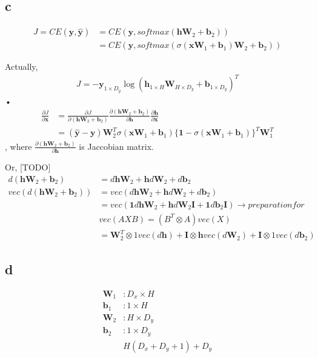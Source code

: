 \documentclass[11pt, oneside]{article}   	%
\begin{document}
\subsection{c}
\begin{align}
J = CE(\bm{y}, \hat{\bm{y}}) &= CE(\bm{y}, softmax(\bm{h}\bm{W}_2+\bm{b}_2))\\
&= CE(\bm{y}, softmax(\sigma(\bm{x}\bm{W}_1+\bm{b}_1)\bm{W}_2+\bm{b}_2))
\end{align}

Actually, 
\begin{align}
J = - \bm{y}_{1\times D_y} {\log (\bm{h}_{1\times H}\bm{W}_{H \times D_y}+\bm{b}_{1\times D_y})}^T
\end{align}•
\begin{align}
\frac{\partial J}{\partial \bm{x}} &=\frac{\partial J}{\partial (\bm{h}\bm{W}_2+\bm{b}_2)}\frac{\partial (\bm{h}\bm{W}_2+\bm{b}_2)}{\partial \bm{h}}\frac{\partial \bm{h}}{\partial \bm{x}}\\
&= (\hat{\bm{y}} - \bm{y})\bm{W}_2^T\sigma(\bm{x}\bm{W}_1+\bm{b}_1)\{\bm{1} - \sigma(\bm{x}\bm{W}_1+\bm{b}_1)\}^T\bm{W}_1^T
\end{align},
where $\frac{\partial (\bm{h}\bm{W}_2+\bm{b}_2)}{\partial \bm{h}}$ is Jaccobian matrix.

Or, [TODO]
\begin{align}
d(\bm{h}\bm{W}_2+\bm{b}_2) &= d\bm{h}\bm{W}_2+\bm{h}d\bm{W}_2+d\bm{b}_2\\
vec(d(\bm{h}\bm{W}_2+\bm{b}_2)) &= vec(d\bm{h}\bm{W}_2+\bm{h}d\bm{W}_2+d\bm{b}_2)\\
&= vec(\bm{1}d\bm{h}\bm{W}_2+\bm{h}d\bm{W}_2\bm{I}+\bm{1}d\bm{b}_2\bm{I}) \to preparation for\\
& vec(AXB) = (B^T\otimes A)vec(X)\\
&= \bm{W}_2^T\otimes 1 vec(d\bm{h}) + \bm{I}\otimes \bm{h} vec(d\bm{W}_2) +\bm{I}\otimes 1 vec( d\bm{b}_2)
\end{align}

\subsection{d}
\begin{align}
\bm{W}_1&: D_x \times H\\
\bm{b}_1&: 1 \times H\\
\bm{W}_2 &: H \times D_y\\
\bm{b}_2 &: 1 \times D_y\\
&H(D_x+D_y+1)+D_y
\end{align}
\end{document}
